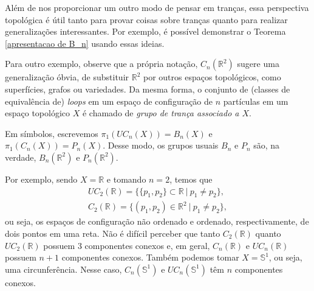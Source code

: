 	\par\vspace{0.3cm} Além de nos proporcionar um outro modo de pensar em tranças,
	essa perspectiva topológica é útil tanto para provar coisas sobre tranças quanto 
	para realizar generalizações interessantes. Por exemplo, é possível demonstrar o 
	Teorema \ref{apresentacao de B_n} usando essas ideias. 
	
	\par\vspace{0.3cm} Para outro exemplo, observe que a própria notação, 
	$C_n(\mathbb{R}^2)$ sugere uma generalização óbvia, de substituir $\mathbb{R}^2$ 
	por outros espaços topológicos, como superfícies, grafos ou variedades. 
	Da mesma forma, o conjunto de (classes de equivalência de) \textit{loops} em um 
	espaço de configuração de $n$ partículas em um espaço topológico $X$ é chamado de 
	\textit{grupo de trança associado a $X$}.
	
	\par\vspace{0.3cm} Em símbolos, escrevemos $\pi_1(UC_n(X)) = B_n(X)$ e $\pi_1(C_n(X)) = P_n(X)$. 
	Desse modo, os grupos usuais $B_n$ e $P_n$ são, na verdade, $B_n(\mathbb{R}^2)$ e $P_n(\mathbb{R}^2)$.
	
	\par\vspace{0.3cm} Por exemplo, sendo $X = \mathbb{R}$ e tomando $n=2$, temos que
	\begin{align*}
    	UC_2(\mathbb{R}) = \big\{  \{p_1,p_2\}\subset\mathbb{R} \ | \ p_1\neq p_2  \big\}, \\
    	C_2(\mathbb{R}) = \big\{ (p_1,p_2)\in\mathbb{R}^2 \ | \ p_1\neq p_2 \big\},
	\end{align*}
	ou seja, os espaços de configuração não ordenado e ordenado, respectivamente, de dois 
	pontos em uma reta. Não é difícil perceber que tanto $C_2(\mathbb{R})$ quanto 
	$UC_2(\mathbb{R})$ possuem 3 componentes conexos e, em geral, $C_n(\mathbb{R})$ e 
	$UC_n(\mathbb{R})$ possuem $n+1$ componentes conexos. Também podemos tomar $X = \mathbb{S}^1$, 
	ou seja, uma circunferência. Nesse caso, $C_n(\mathbb{S}^1)$ e $UC_n(\mathbb{S}^1)$ 
	têm $n$ componentes conexos.
	
